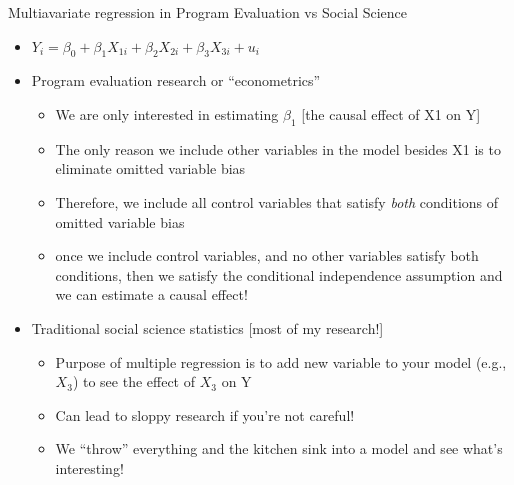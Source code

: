 \documentclass[8pt,ignorenonframetext,dvipsnames]{beamer}
\providecommand{\tightlist}{%
  \setlength{\itemsep}{0pt}\setlength{\parskip}{0pt}}
\let\olditem\item
\renewcommand{\item}{%
  \olditem\vspace{4pt}
}
\begin{document}
\begin{frame}{Multiavariate regression in Program Evaluation vs Social
Science}
\protect\hypertarget{multiavariate-regression-in-program-evaluation-vs-social-science}{}

\begin{itemize}
\tightlist
\item
  \(Y_i = \beta_0 + \beta_1X_{1i} + \beta_2X_{2i} + \beta_3X_{3i} + u_i\)
\item
  Program evaluation research or ``econometrics''

  \begin{itemize}
  \tightlist
  \item
    We are only interested in estimating \(\beta_1\) {[}the causal
    effect of X1 on Y{]}
  \item
    The only reason we include other variables in the model besides X1
    is to eliminate omitted variable bias
  \item
    Therefore, we include all control variables that satisfy \emph{both}
    conditions of omitted variable bias
  \item
    once we include control variables, and no other variables satisfy
    both conditions, then we satisfy the conditional independence
    assumption and we can estimate a causal effect!
  \end{itemize}
\item
  Traditional social science statistics {[}most of my research!{]}

  \begin{itemize}
  \tightlist
  \item
    Purpose of multiple regression is to add new variable to your model
    (e.g., \(X_3\)) to see the effect of \(X_3\) on Y
  \item
    Can lead to sloppy research if you're not careful!
  \item
    We ``throw'' everything and the kitchen sink into a model and see
    what's interesting!
  \end{itemize}
\end{itemize}

\end{frame}
\end{document}
